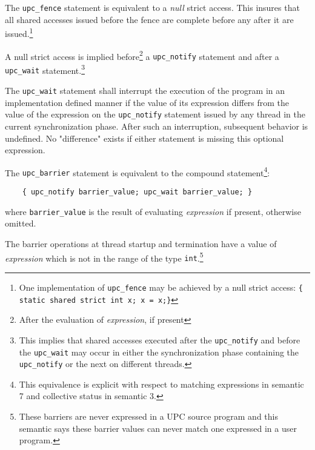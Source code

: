 \documentclass[12pt,titlepage]{article}
\newcounter{parnum}
\newcommand\np{\addtocounter{parnum}{1}\hspace{-2em}\makebox[2em][l]{\arabic{parnum}}}
\begin{document}
\np The {\tt upc\_fence} statement is equivalent to a {\em
    null} strict access.  This insures that all shared accesses
    issued before the fence are complete before any after it are
    issued.\footnote{One implementation of {\tt upc\_fence} 
    may be achieved by a null strict access:
     {\tt  \{ static shared strict int x; x = x;\}}} 

\np A null strict access is implied before\footnote{After the evaluation 
    of {\em expression}, if present} a {\tt upc\_notify} statement and 
    after a {\tt upc\_wait} 
    statement.\footnote{This implies that shared accesses executed 
    after the {\tt upc\_notify} and before the {\tt upc\_wait} may occur in 
    either the synchronization phase containing the {\tt upc\_notify} or 
    the next on different threads.}

\np The {\tt upc\_wait} statement shall interrupt the execution of
    the program in an implementation defined manner
    if the value of its expression differs from the value of
    the expression on the {\tt upc\_notify} statement issued by any
    thread in the current
    synchronization phase.  After such an interruption, subsequent behavior
    is undefined. No "difference" exists if either statement is missing
    this optional expression.


\np The {\tt upc\_barrier} statement is equivalent to the
    compound statement\footnote {This equivalence is explicit with
    respect to matching expressions in semantic 7 and collective
    status in semantic 3.}:

\begin{verbatim}
    { upc_notify barrier_value; upc_wait barrier_value; }
\end{verbatim}

    where {\tt barrier\_value} is the result of evaluating {\em expression}
    if present, otherwise omitted.

\np The barrier operations at thread
    startup and termination have a value of {\em expression} which is not in
    the range of the type {\tt int}.\footnote{These barriers are never expressed
    in a UPC source program and this semantic says these barrier values can
    never match one expressed in a user program.}
\end{document}
